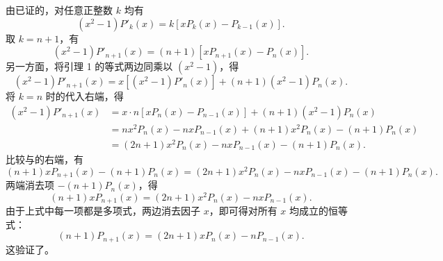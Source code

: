 \begin{myproof}
    由已证的，对任意正整数 $k$ 均有
    \begin{equation}\label{eq:proof-a-1}
        (x^2 - 1) P'_k(x) = k \left[ x P_k(x) - P_{k-1}(x) \right].
    \end{equation}
    取 $k = n+1$，有
    \begin{equation}\label{eq:proof-a-2}
        (x^2 - 1) P'_{n+1}(x) = (n+1) \left[ x P_{n+1}(x) - P_n(x) \right].
    \end{equation}
    另一方面，将引理 1 的等式两边同乘以 $(x^2 - 1)$，得
    \begin{equation}\label{eq:proof-a-3}
        (x^2 - 1) P'_{n+1}(x) = x \left[ (x^2 - 1) P'_n(x) \right] + (n+1)(x^2 - 1) P_n(x).
    \end{equation}
    将 $k = n$ 时的代入右端，得
    \begin{equation}\label{eq:proof-a-4}
        \begin{aligned}
            (x^2 - 1) P'_{n+1}(x) & = x \cdot n \left[ x P_n(x) - P_{n-1}(x) \right] + (n+1)(x^2 - 1) P_n(x) \\
                                  & = n x^2 P_n(x) - n x P_{n-1}(x) + (n+1) x^2 P_n(x) - (n+1) P_n(x)        \\
                                  & = (2n+1) x^2 P_n(x) - n x P_{n-1}(x) - (n+1) P_n(x).
        \end{aligned}
    \end{equation}
    比较与的右端，有
    \begin{equation}\label{eq:proof-a-5}
        (n+1) x P_{n+1}(x) - (n+1) P_n(x) = (2n+1) x^2 P_n(x) - n x P_{n-1}(x) - (n+1) P_n(x).
    \end{equation}
    两端消去项 $-(n+1) P_n(x)$，得
    \begin{equation}\label{eq:proof-a-6}
        (n+1) x P_{n+1}(x) = (2n+1) x^2 P_n(x) - n x P_{n-1}(x).
    \end{equation}
    由于上式中每一项都是多项式，两边消去因子 $x$，即可得对所有 $x$ 均成立的恒等式：
    \begin{equation}\label{eq:proof-a-final}
        (n+1) P_{n+1}(x) = (2n+1) x P_n(x) - n P_{n-1}(x).
    \end{equation}
    这验证了。
\end{myproof}

\endinput
